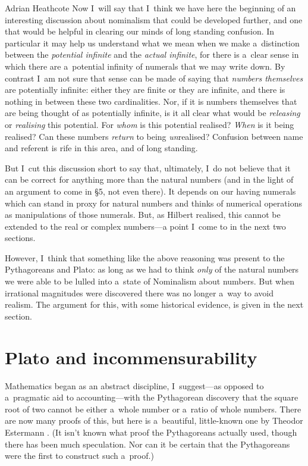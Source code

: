 \begin{artengenv}{Adrian Heathcote}
Now I~will say that I~think we have here the beginning of an interesting discussion about nominalism that could be developed further, and one that would be helpful in clearing our minds of long standing confusion. In particular it may help us understand what we mean when we make a~distinction between the \textit{potential infinite} and the \textit{actual infinite}, for there is a~clear sense in which there are a~potential infinity of numerals that we may write down. By contrast I~am not sure that sense can be made of saying that \textit{numbers themselves} are potentially infinite: either they are finite or they are infinite, and there is nothing in between these two cardinalities. Nor, if it is numbers themselves that are being thought of as potentially infinite, is it all clear what would be \textit{releasing} or \textit{realising} this potential. For \textit{whom} is this potential realised? \textit{When} is it being realised? Can these numbers \textit{return} to being \textit{un}realised? Confusion between name and referent is rife in this area, and of long standing.

But I~cut this discussion short to say that, ultimately, I~do not believe that it can be correct for anything more than the natural numbers (and in the light of an argument to come in \S 5, not even there). It depends on our having numerals which can stand in proxy for natural numbers and thinks of numerical operations as manipulations of those numerals. But, as Hilbert realised, this cannot be extended to the real or complex numbers---a point I~come to in the next two sections.

However, I~think that something like the above reasoning was present to the Pythagoreans and Plato: as long as we had to think \textit{only} of the natural numbers we were able to be lulled into a~state of Nominalism about numbers. But when irrational magnitudes were discovered there was no longer a~way to avoid realism. The argument for this, with some historical evidence, is given in the next section.




\section{Plato and incommensurability}

Mathematics began as an abstract discipline, I~suggest---as opposed to a~pragmatic aid to accounting---with the Pythagorean discovery that the square root of two cannot be either a~whole number or a~ratio of whole numbers. There are now many proofs of this, but here is a~beautiful, little-known one by Theodor Estermann \parencite*{estermann_irrationality_1975}.
 (It isn't known what proof the Pythagoreans actually used, though there has been much speculation. Nor can it be certain that the Pythagoreans were the first to construct such a~proof.) 


\end{artengenv}
